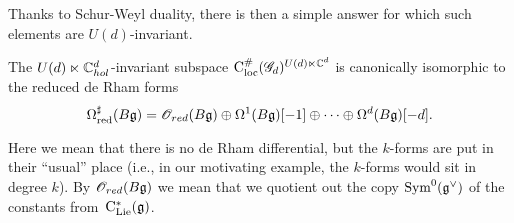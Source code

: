 
Thanks to Schur-Weyl duality, there is then a simple answer for which such elements are $U(d)$-invariant.

\begin{lem}
The $U(d) \ltimes \mathbb C^d_{hol}$-invariant subspace ${\rm C}_{\rm loc}^\#(\mathscr G_d)^{U(d) \ltimes \mathbb C^d}$
is canonically isomorphic to the reduced de Rham forms
\[
\Omega^\sharp_{\rm red}(B\mathfrak g) = \mathscr O_{red}(B \mathfrak g) \oplus \Omega^{1} (B \mathfrak g)[-1] \oplus \cdots \oplus \Omega^{d}(B \mathfrak g)[-d]. 
\]
\end{lem}

Here we mean that there is no de Rham differential, 
but the $k$-forms are put in their ``usual'' place 
(i.e., in our motivating example, the $k$-forms would sit in degree $k$).
By $\mathscr O_{red}(B \mathfrak g)$ we mean that we quotient out the copy ${\rm Sym}^0(\mathfrak g^\vee)$ of the constants from~${\rm C}_{{\rm Lie}}^*(\mathfrak g)$.

